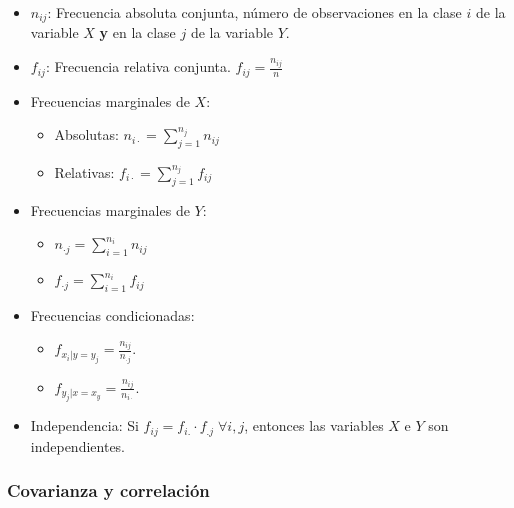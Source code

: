 \documentclass[
]{article}
\providecommand{\tightlist}{%
  \setlength{\itemsep}{0pt}\setlength{\parskip}{0pt}}
\begin{document}
\begin{itemize}
\item
  \(n_{ij}\): Frecuencia absoluta conjunta, número de observaciones en
  la clase \(i\) de la variable \(X\) \textbf{y} en la clase \(j\) de la
  variable \(Y\).
\item
  \(f_{ij}\): Frecuencia relativa conjunta.
  \(f_{ij} = \frac{n_{ij}}{n}\)
\item
  Frecuencias marginales de \(X\):

  \begin{itemize}
  \tightlist
  \item
    Absolutas: \(n_{i\cdot} = \sum\limits_{j = 1}^{n_j}n_{ij}\)
  \item
    Relativas: \(f_{i\cdot} = \sum\limits_{j = 1}^{n_j}f_{ij}\)
  \end{itemize}
\item
  Frecuencias marginales de \(Y\):

  \begin{itemize}
  \tightlist
  \item
    \(n_{\cdot j} = \sum\limits_{i = 1}^{n_i}n_{ij}\)
  \item
    \(f_{\cdot j} = \sum\limits_{i = 1}^{n_i}f_{ij}\)
  \end{itemize}
\item
  Frecuencias condicionadas:

  \begin{itemize}
  \tightlist
  \item
    \(f_{x_i|y=y_j}=\frac{n_{ij}}{n_{·j}}.\)
  \item
    \(f_{y_j|x=x_y}=\frac{n_{ij}}{n_{i·}}.\)
  \end{itemize}
\item
  Independencia: Si \(f_{ij} = f_{i.}\cdot f_{.j} \;\forall i, j\),
  entonces las variables \(X\) e \(Y\) son independientes.
\end{itemize}

\hypertarget{covarianza-y-correlaciuxf3n}{%
\subsubsection{Covarianza y
correlación}\label{covarianza-y-correlaciuxf3n}}
\end{document}
